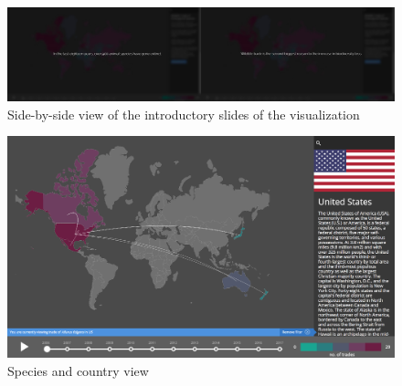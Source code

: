 \begin{figure}[!h]
\centering
\includegraphics[width=\linewidth]{images/vis_intro.jpg}
\caption{Side-by-side view of the introductory slides of the visualization}
\label{vis_intro_img}
\end{figure}

\begin{figure}[!h]
\centering
\includegraphics[width=\linewidth]{images/pandaus.png}
\caption{Species and country view}
 \label{visid2}
\end{figure}